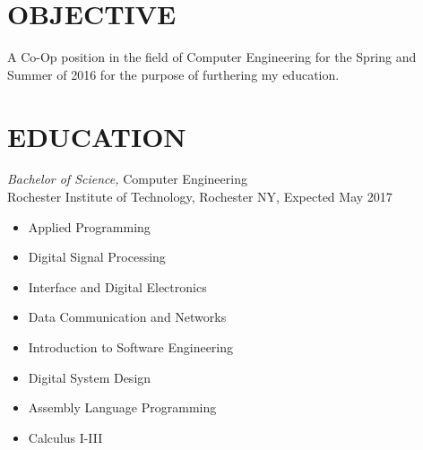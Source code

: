 \documentclass[line,margin]{res}
\begin{document}
\setlength\columnsep{-30pt}
\address{56 South Street Drury, MA}
\address{CRC3510@RIT.EDU}
\address{(413) 376-5034}
 
\begin{resume}
 \setlength\multicolsep{2pt}

\section{OBJECTIVE}   
	A Co-Op position in the field of Computer Engineering for the Spring and Summer of 2016 for the purpose of furthering my education.  
 
\section{EDUCATION} {\sl Bachelor of Science,} Computer Engineering \\
                Rochester Institute of Technology, Rochester NY, 
				Expected May 2017 %
				\begin{multicols}{2}
					\begin{itemize}
						\itemsep -2pt
						\item[] Applied Programming
						\item[] Digital Signal Processing
						\item[] Interface and Digital Electronics
						\item[] Data Communication and Networks
						\item[] Introduction to Software Engineering
						\item[] Digital System Design
						\item[] Assembly Language Programming
						\item[] Calculus I-III
					\end{itemize}
				\end{multicols}
 

\end{resume}
\end{document}
